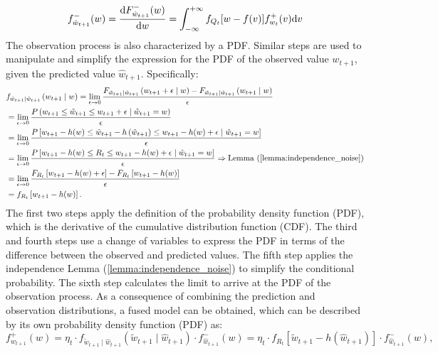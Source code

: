 \begin{equation}\small
   f_{\hat{w}_{t+1}}^{-}(w)=\frac{\mathrm{d} F_{\hat{w}_{t+1}}^{-}(w)}{\mathrm{d} w}=\int_{-\infty}^{+\infty} f_{Q_t}[w-f(v)] f_{w_t}^{+}(v) \mathrm{d} v
\end{equation}
The observation process is also characterized by a PDF. Similar steps are used to manipulate and simplify the expression for the PDF of the observed value $w_{t+1}$, given the predicted value $\hat{w}_{t+1}$. Specifically:
\begin{equation}
   \begin{aligned}
   &f_{\tilde{w}_{t+1} \mid \hat{w}_{t+1}}\left(w_{t+1} \mid w\right)=\lim _{\epsilon \rightarrow 0} \frac{F_{\tilde{w}_{t+1} \mid \hat{w}_{t+1}}\left(w_{t+1}+\epsilon \mid w\right)-F_{\tilde{w}_{t+1} \mid \hat{w}_{t+1}}\left(w_{t+1} \mid w\right)}{\epsilon}\\
   &=\lim _{\epsilon \rightarrow 0} \frac{P\left(w_{t+1} \leq \tilde{w}_{t+1} \leq w_{t+1}+\epsilon \mid \hat{w}_{t+1}=w\right)}{\epsilon} \\
   &=\lim _{\epsilon \rightarrow 0} \frac{P\left[w_{t+1}-h(w) \leq \tilde{w}_{t+1}-h\left(\hat{w}_{t+1}\right) \leq w_{t+1}-h(w)+\epsilon \mid \hat{w}_{t+1}=w\right]}{\epsilon}\\
   &=\lim _{\epsilon \rightarrow 0} \frac{P\left[w_{t+1}-h(w) \leq R_t \leq w_{t+1}-h(w)+\epsilon \mid \hat{w}_{t+1}=w\right]}{\epsilon} \Rightarrow \text{Lemma (\ref{lemma:independence_noise})}\\
   &=\lim _{\epsilon \rightarrow 0} \frac{F_{R_t}\left[w_{t+1}-h(w)+\epsilon\right]-F_{R_t}\left[w_{t+1}-h(w)\right]}{\epsilon}\\
   &=f_{R_t}\left[w_{t+1}-h(w)\right].
   \end{aligned}
   \end{equation}
The first two steps apply the definition of the probability density function (PDF), which is the derivative of the cumulative distribution function (CDF). The third and fourth steps use a change of variables to express the PDF in terms of the difference between the observed and predicted values. The fifth step applies the independence Lemma (\ref{lemma:independence_noise}) to simplify the conditional probability. The sixth step calculates the limit to arrive at the PDF of the observation process.
As a consequence of combining the prediction and observation distributions, a fused model can be obtained, which can be described by its own probability density function (PDF) as:
\begin{equation}
   f_{w_{t+1}}^{+}(w)=\eta_t \cdot f_{\tilde{w}_{t+1} \mid \hat{w}_{t+1}}\left(\tilde{w}_{t+1} \mid \hat{w}_{t+1}\right) \cdot f_{\hat{w}_{t+1}}^{-}(w)=\eta_t \cdot f_{R_t}\left[\tilde{w}_{t+1}-h(\hat{w}_{t+1})\right] \cdot f_{\hat{w}_{t+1}}^{-}(w),
\end{equation}
